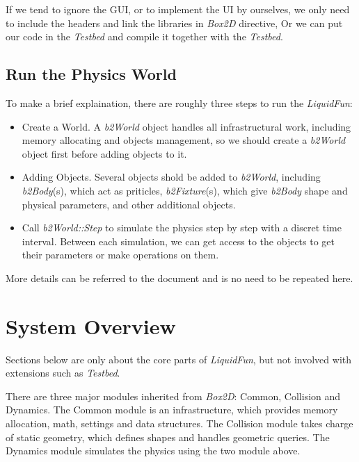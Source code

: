\documentclass[UTF8]{ctexart}
\begin{document}
            If we tend to ignore the GUI, or to implement the UI by ourselves, we only need to include the headers and link the libraries in \textit{Box2D} directive, Or we can put our code in the \textit{Testbed} and compile it together with the \textit{Testbed}.

        \subsection{Run the Physics World}

            To make a brief explaination, there are roughly three steps to run the \textit{LiquidFun}:

            \begin{itemize}
                \item Create a World. A \textit{b2World} object handles all infrastructural work, including memory allocating and objects management, so we should create a \textit{b2World} object first before adding objects to it.
                \item Adding Objects. Several objects shold be added to \textit{b2World}, including \textit{b2Body}(s), which act as priticles, \textit{b2Fixture}(s), which give \textit{b2Body} shape and physical parameters, and other additional objects.
                \item Call \textit{b2World::Step} to simulate the physics step by step with a discret time interval. Between each simulation, we can get access to the objects to get their parameters or make operations on them.
            \end{itemize}

            More details can be referred to the document and is no need to be repeated here.

    \section{System Overview}

        Sections below are only about the core parts of \textit{LiquidFun}, but not involved with extensions such as \textit{Testbed}.

        There are three major modules inherited from \textit{Box2D}: Common, Collision and Dynamics. The Common module is an infrastructure, which provides memory allocation, math, settings and data structures. The Collision module takes charge of static geometry, which defines shapes and handles geometric queries. The Dynamics module simulates the physics using the two module above.
\end{document}
